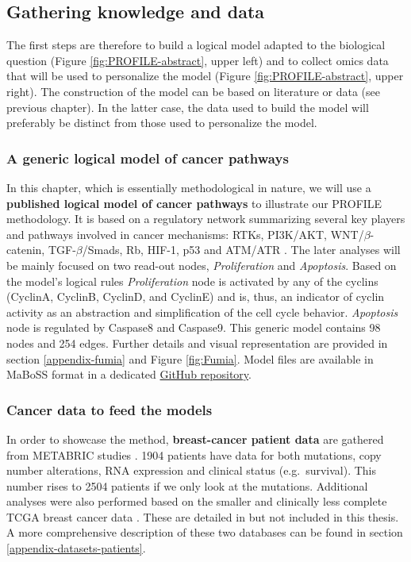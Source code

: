\documentclass[a4paper,12pt,twoside,onecolumn,openright,final,oldfontcommands]{memoir}
\begin{document}
\subsection{Gathering knowledge and
data}\label{gathering-knowledge-and-data}

The first steps are therefore to build a logical model adapted to the
biological question (Figure \ref{fig:PROFILE-abstract}, upper left) and
to collect omics data that will be used to personalize the model (Figure
\ref{fig:PROFILE-abstract}, upper right). The construction of the model
can be based on literature or data (see previous chapter). In the latter
case, the data used to build the model will preferably be distinct from
those used to personalize the model.

\subsubsection{A generic logical model of cancer
pathways}\label{a-generic-logical-model-of-cancer-pathways}

In this chapter, which is essentially methodological in nature, we will
use a \textbf{published logical model of cancer pathways} to illustrate
our PROFILE methodology. It is based on a regulatory network summarizing
several key players and pathways involved in cancer mechanisms: RTKs,
PI3K/AKT, WNT/\(\beta\)-catenin, TGF-\(\beta\)/Smads, Rb, HIF-1, p53 and
ATM/ATR \citep{fumia2013boolean}. The later analyses will be mainly
focused on two read-out nodes, \emph{Proliferation} and
\emph{Apoptosis}. Based on the model's logical rules
\emph{Proliferation} node is activated by any of the cyclins (CyclinA,
CyclinB, CyclinD, and CyclinE) and is, thus, an indicator of cyclin
activity as an abstraction and simplification of the cell cycle
behavior. \emph{Apoptosis} node is regulated by Caspase8 and Caspase9.
This generic model contains 98 nodes and 254 edges. Further details and
visual representation are provided in section \ref{appendix-fumia} and
Figure \ref{fig:Fumia}. Model files are available in MaBoSS format in a
dedicated
\href{https://github.com/sysbio-curie/PROFILE/tree/master/Models/Fumia2013}{GitHub
repository}.

\subsubsection{Cancer data to feed the
models}\label{cancer-data-to-feed-the-models}

In order to showcase the method, \textbf{breast-cancer patient data} are
gathered from METABRIC studies
\citep{curtis2012genomic, pereira2016somatic}. 1904 patients have data
for both mutations, copy number alterations, RNA expression and clinical
status (e.g.~survival). This number rises to 2504 patients if we only
look at the mutations. Additional analyses were also performed based on
the smaller and clinically less complete TCGA breast cancer data
\citep{cancer2012comprehensive}. These are detailed in
\citet{beal2019personalization} but not included in this thesis. A more
comprehensive description of these two databases can be found in section
\ref{appendix-datasets-patients}.
\end{document}
